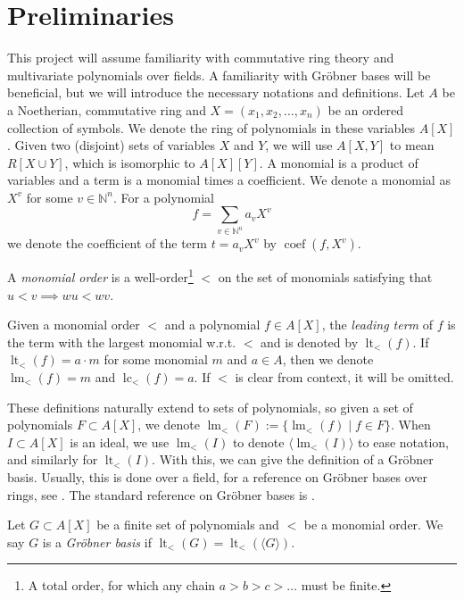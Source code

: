 \documentclass[a4paper, 12pt]{article}
\newcommand{\N}{\mathbb{N}}
\DeclareMathOperator{\LT}{lt}
\DeclareMathOperator{\LM}{lm}
\DeclareMathOperator{\LC}{lc}
\DeclareMathOperator{\coef}{coef}
\theoremstyle{changedot}
\theoremstyle{changedotbreak}
\theoremstyle{nonumberplain}
\begin{document}
\section{Preliminaries}
This project will assume familiarity with commutative ring theory and multivariate polynomials over fields. A familiarity with Gröbner bases will be beneficial, but we will introduce the necessary notations and definitions. Let $A$ be a Noetherian, commutative ring and $X = (x_{1}, x_{2}, \dots, x_{n})$ be an ordered collection of symbols. We denote the ring of polynomials in these variables $A[X]$. Given two (disjoint) sets of variables $X$ and $Y$, we will use $A[X, Y]$ to mean $R[X \cup Y]$, which is isomorphic to $A[X][Y]$. A monomial is a product of variables and a term is a monomial times a coefficient. We denote a monomial as $X^{v}$ for some $v \in \N^{n}$. For a polynomial \[f = \sum_{v \in \N^{n}} a_{v}X^{v}\] we denote the coefficient of the term $t = a_{v}X^{v}$ by $\coef(f, X^{v})$.

\begin{definition}
  A \textit{monomial order} is a well-order\footnote{A total order, for which any chain $a > b > c > \dots$ must be finite.} $<$ on the set of monomials satisfying that $u < v \implies wu < wv$.

  Given a monomial order $<$ and a polynomial $f \in A[X]$, the \textit{leading term} of $f$ is the term with the largest monomial w.r.t. $<$ and is denoted by $\LT_{<}(f)$. If $\LT_{<}(f) = a\cdot m$ for some monomial $m$ and $a \in A$, then we denote $\LM_{<}(f) = m$ and $\LC_{<}(f) = a$. If $<$ is clear from context, it will be omitted.
\end{definition}

These definitions naturally extend to sets of polynomials, so given a set of polynomials $F \subset A[X]$, we denote $\LM_{<}(F) := \{\LM_{<}(f) \mid f \in F\}$. When $I \subset A[X]$ is an ideal, we use $\LM_{<}(I)$ to denote $\langle \LM_{<}(I) \rangle$ to ease notation, and similarly for $\LT_{<}(I)$. With this, we can give the definition of a Gröbner basis. Usually, this is done over a field, for a reference on Gröbner bases over rings, see \cite{loustaunau1994introduction}. The standard reference on Gröbner bases is \cite{IVA}.

\begin{definition}
  Let $G \subset A[X]$ be a finite set of polynomials and $<$ be a monomial order. We say $G$ is a \textit{Gröbner basis} if
  $\LT_{<}(G) = \LT_{<}(\langle G \rangle )$.
\end{definition}
\end{document}
